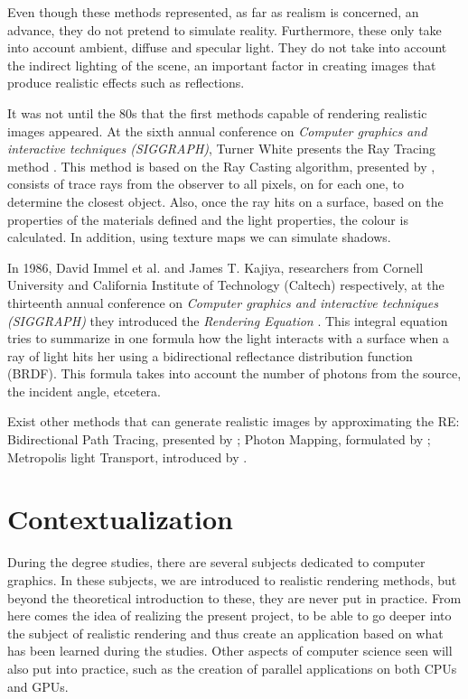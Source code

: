 \documentclass[titlepage,12pt]{article}
\begin{document}
Even though these methods represented, as far as realism is concerned, an advance, they do not pretend to simulate reality. Furthermore, these only take into account ambient, diffuse and specular light. They do not take into account the indirect lighting of the scene, an important factor in creating images that produce realistic effects such as reflections.

It was not until the 80s that the first methods capable of rendering realistic images appeared. At the sixth annual conference on \textit{Computer graphics and interactive techniques (SIGGRAPH)}, Turner White presents the Ray Tracing method \citep[pp.~343--349]{Whitted1980}. This method is based on the Ray Casting algorithm, presented by \citep[pp.~37--45]{Appel1968}, consists of trace rays from the observer to all pixels, on for each one, to determine the closest object. Also, once the ray hits on a surface, based on the properties of the materials defined and the light properties, the colour is calculated. In addition, using texture maps we can simulate shadows.

In 1986, David Immel et al. and James T. Kajiya, researchers from Cornell University and California Institute of Technology (Caltech) respectively, at the thirteenth annual conference on \textit{Computer graphics and interactive techniques (SIGGRAPH)} they introduced the \textit{Rendering Equation} \citep[pp.~143--150, pp.~133--142]{Kajiya1986, Immel1986}. This integral equation tries to summarize in one formula how the light interacts with a surface when a ray of light hits her using a bidirectional reflectance distribution function (BRDF). This formula takes into account the number of photons from the source, the incident angle, etcetera.

Exist other methods that can generate realistic images by approximating the RE: Bidirectional Path Tracing, presented by \citep[pp.~145--153]{Lafortune1993}; Photon Mapping, formulated by \citep[pp. ~21--30]{Jensen1996}; Metropolis light Transport, introduced by \citep[pp. ~65--76]{Veach1997}.

\newpage

\section{Contextualization}

During the degree studies, there are several subjects dedicated to computer graphics. In these subjects, we are introduced to realistic rendering methods, but beyond the theoretical introduction to these, they are never put in practice. From here comes the idea of realizing the present project, to be able to go deeper into the subject of realistic rendering and thus create an application based on what has been learned during the studies. Other aspects of computer science seen will also put into practice, such as the creation of parallel applications on both CPUs and GPUs.
\end{document}
